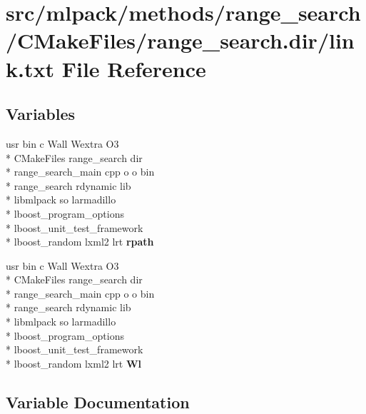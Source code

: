 \section{src/mlpack/methods/range\-\_\-search/\-C\-Make\-Files/range\-\_\-search.dir/link.txt File Reference}
\label{methods_2range__search_2CMakeFiles_2range__search_8dir_2link_8txt}
\subsection*{Variables}
\begin{DoxyCompactItemize}
\item 
usr bin c Wall Wextra O3 \\*
C\-Make\-Files range\-\_\-search dir \\*
range\-\_\-search\-\_\-main cpp o o bin \\*
range\-\_\-search rdynamic lib \\*
libmlpack so larmadillo \\*
lboost\-\_\-program\-\_\-options \\*
lboost\-\_\-unit\-\_\-test\-\_\-framework \\*
lboost\-\_\-random lxml2 lrt {\bf rpath}
\item 
usr bin c Wall Wextra O3 \\*
C\-Make\-Files range\-\_\-search dir \\*
range\-\_\-search\-\_\-main cpp o o bin \\*
range\-\_\-search rdynamic lib \\*
libmlpack so larmadillo \\*
lboost\-\_\-program\-\_\-options \\*
lboost\-\_\-unit\-\_\-test\-\_\-framework \\*
lboost\-\_\-random lxml2 lrt {\bf Wl}
\end{DoxyCompactItemize}


\subsection{Variable Documentation}
